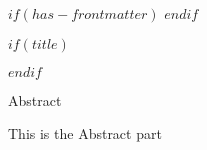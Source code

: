 $if(has-frontmatter)$
\frontmatter
$endif$

$if(title)$
\maketitle
$endif$

\newpage


\begin{center}
\Large{Abstract}
\end{center}

\vspace*{\baselineskip}

This is the Abstract part

\newpage
